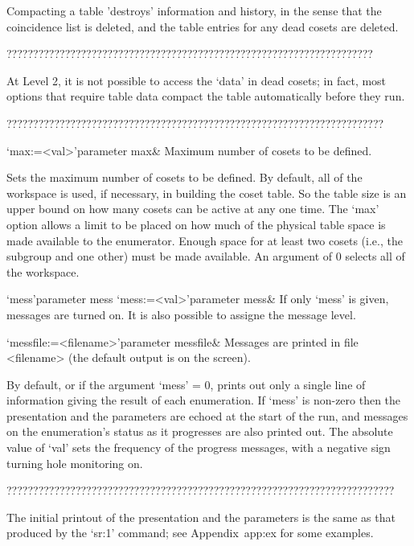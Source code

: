 Compacting a  table 'destroys' information  and history, in  the sense
that the  coincidence list is deleted,  and the table  entries for any
dead cosets are deleted.

?????????????????????????????????????????????????????????????????????

At Level 2, it is not possible to access the `data' in dead cosets; in
fact, most options that require table data compact the table 
automatically before they run.

???????????????????????????????????????????????????????????????????????

\>`max:=<val>'{parameter max}&
Maximum number of cosets to be defined.

Sets the maximum  number of cosets to be defined.   By default, all of
the workspace is used, if  necessary, in building the coset table.  So
the table size is  an upper bound on how many cosets  can be active at
any one  time.  The `max'  option allows a  limit to be placed  on how
much of the physical table  space is made available to the enumerator.
Enough  space for  at least  two cosets  (i.e., the  subgroup  and one
other) must  be made available.  An  argument of 0 selects  all of the
workspace.

\enditems



\beginitems

\>`mess'{parameter mess}
\>`mess:=<val>'{parameter mess}&
If only `mess' is given, messages are turned on. It is also possible to
assigne the message level.

\>`messfile:=<filename>'{parameter messfile}&
Messages are printed in file <filename> (the default output is on the
screen).

\enditems

By default,  or if the argument `mess'  = 0, {\ACE} prints  out only a
single line of information giving  the result of each enumeration.  If
`mess' is non-zero then the presentation and the parameters are echoed
at the start  of the run, and messages on  the enumeration's status as
it progresses are also printed  out.  The absolute value of `val' sets
the frequency of  the progress messages, with a  negative sign turning
hole monitoring on.

?????????????????????????????????????????????????????????????????????????

The initial printout of the presentation and the parameters is the same
as that produced by the `sr:1' command; see Appendix~{app:ex}
  for some examples.

